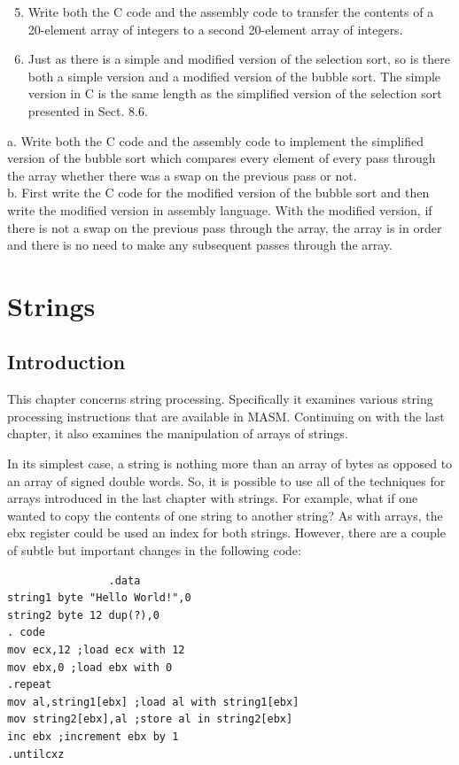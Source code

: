 \documentclass[10pt]{book}
\begin{document}
\begin{enumerate}
  \setcounter{enumi}{4}
  \item Write both the C code and the assembly code to transfer the contents of a 20-element array of integers to a second 20-element array of integers.
  \item Just as there is a simple and modified version of the selection sort, so is there both a simple version and a modified version of the bubble sort. The simple version in C is the same length as the simplified version of the selection sort presented in Sect. 8.6.
\end{enumerate}
a. Write both the C code and the assembly code to implement the simplified version of the bubble sort which compares every element of every pass through the array whether there was a swap on the previous pass or not.\\
b. First write the C code for the modified version of the bubble sort and then write the modified version in assembly language. With the modified version, if there is not a swap on the previous pass through the array, the array is in order and there is no need to make any subsequent passes through the array.

\section{Strings}
\subsection{Introduction}
This chapter concerns string processing. Specifically it examines various string processing instructions that are available in MASM. Continuing on with the last chapter, it also examines the manipulation of arrays of strings.

In its simplest case, a string is nothing more than an array of bytes as opposed to an array of signed double words. So, it is possible to use all of the techniques for arrays introduced in the last chapter with strings. For example, what if one wanted to copy the contents of one string to another string? As with arrays, the ebx register could be used an index for both strings. However, there are a couple of subtle but important changes in the following code:

\begin{verbatim}
                .data
string1 byte "Hello World!",0
string2 byte 12 dup(?),0
. code
mov ecx,12 ;load ecx with 12
mov ebx,0 ;load ebx with 0
.repeat
mov al,string1[ebx] ;load al with string1[ebx]
mov string2[ebx],al ;store al in string2[ebx]
inc ebx ;increment ebx by 1
.untilcxz
\end{verbatim}
\end{document}

